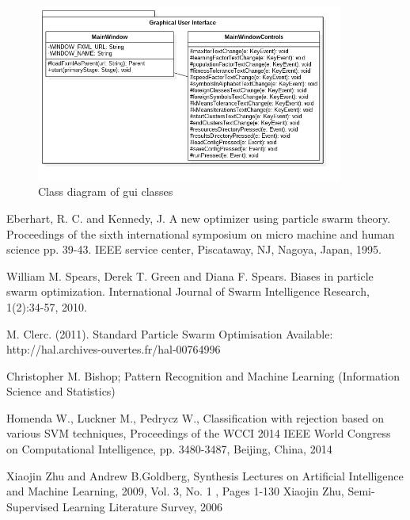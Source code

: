 \documentclass{mini}
\begin{document}
\begin{figure}[H]
    \centering
    \includegraphics[width=0.9\textwidth]{images/gui.jpg}
    \caption{Class diagram of gui classes}
    \label{fig:gui_classes}
\end{figure}





\begin{thebibliography}{1}
    
    Eberhart, R. C. and Kennedy, J. A new optimizer using particle swarm theory. Proceedings of the sixth international symposium on micro machine and human science pp. 39-43. IEEE service center, Piscataway, NJ, Nagoya, Japan, 1995.
    
    
    
    
    William M. Spears, Derek T. Green and Diana F. Spears. Biases in particle swarm optimization. International Journal of Swarm Intelligence Research, 1(2):34-57, 2010.
    
    
    
    
    M. Clerc. (2011). Standard Particle Swarm Optimisation Available: http://hal.archives-ouvertes.fr/hal-00764996 
    
     Christopher M. Bishop; Pattern Recognition and Machine Learning (Information Science and Statistics)
    
	 Homenda W., Luckner M., Pedrycz W., Classification with rejection based on various SVM techniques, Proceedings of the WCCI 2014 IEEE World Congress on Computational Intelligence, pp. 3480-3487, Beijing, China, 2014     
    
	 Xiaojin Zhu and Andrew B.Goldberg, Synthesis Lectures on Artificial Intelligence and Machine Learning, 2009, Vol. 3, No. 1 , Pages 1-130    
     Xiaojin Zhu, Semi-Supervised Learning Literature Survey, 2006
\end{thebibliography}


\makestatement
\end{document}
